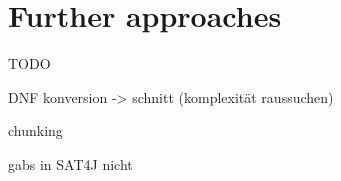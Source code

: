 \section{Further approaches}
TODO

DNF konversion -> schnitt (komplexität raussuchen)

chunking

gabs in SAT4J nicht